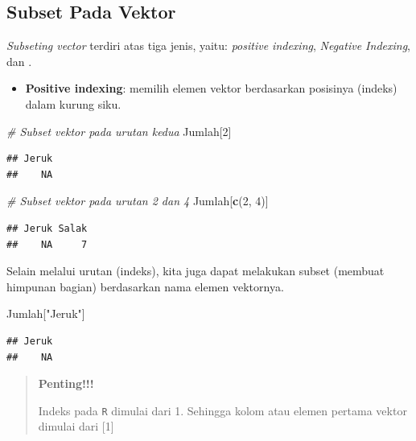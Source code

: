 \documentclass[
]{book}
\newenvironment{Shaded}{\begin{snugshade}}{\end{snugshade}}
\newcommand{\CommentTok}[1]{\textcolor[rgb]{0.56,0.35,0.01}{\textit{#1}}}
\newcommand{\DecValTok}[1]{\textcolor[rgb]{0.00,0.00,0.81}{#1}}
\newcommand{\FunctionTok}[1]{\textcolor[rgb]{0.13,0.29,0.53}{\textbf{#1}}}
\newcommand{\NormalTok}[1]{#1}
\newcommand{\StringTok}[1]{\textcolor[rgb]{0.31,0.60,0.02}{#1}}
\providecommand{\tightlist}{%
  \setlength{\itemsep}{0pt}\setlength{\parskip}{0pt}}
\theoremstyle{definition}
\theoremstyle{definition}
\theoremstyle{definition}
\theoremstyle{definition}
\theoremstyle{remark}
\begin{document}
\hypertarget{subsetvector}{%
\subsection{Subset Pada Vektor}\label{subsetvector}}

\emph{Subseting vector} terdiri atas tiga jenis, yaitu: \emph{positive indexing}, \emph{Negative Indexing}, dan .

\begin{itemize}
\tightlist
\item
  \textbf{Positive indexing}: memilih elemen vektor berdasarkan posisinya (indeks) dalam kurung siku.
\end{itemize}

\begin{Shaded}
\begin{Highlighting}[]
\CommentTok{\# Subset vektor pada urutan kedua}
\NormalTok{Jumlah[}\DecValTok{2}\NormalTok{]}
\end{Highlighting}
\end{Shaded}

\begin{verbatim}
## Jeruk 
##    NA
\end{verbatim}

\begin{Shaded}
\begin{Highlighting}[]
\CommentTok{\# Subset vektor pada urutan 2 dan 4}
\NormalTok{Jumlah[}\FunctionTok{c}\NormalTok{(}\DecValTok{2}\NormalTok{, }\DecValTok{4}\NormalTok{)]}
\end{Highlighting}
\end{Shaded}

\begin{verbatim}
## Jeruk Salak 
##    NA     7
\end{verbatim}

Selain melalui urutan (indeks), kita juga dapat melakukan subset (membuat himpunan bagian) berdasarkan nama elemen vektornya.

\begin{Shaded}
\begin{Highlighting}[]
\NormalTok{Jumlah[}\StringTok{"Jeruk"}\NormalTok{]}
\end{Highlighting}
\end{Shaded}

\begin{verbatim}
## Jeruk 
##    NA
\end{verbatim}

\begin{quote}
\textbf{Penting!!!}

Indeks pada \texttt{R} dimulai dari 1. Sehingga kolom atau elemen pertama vektor dimulai dari {[}1{]}
\end{quote}
\end{document}

